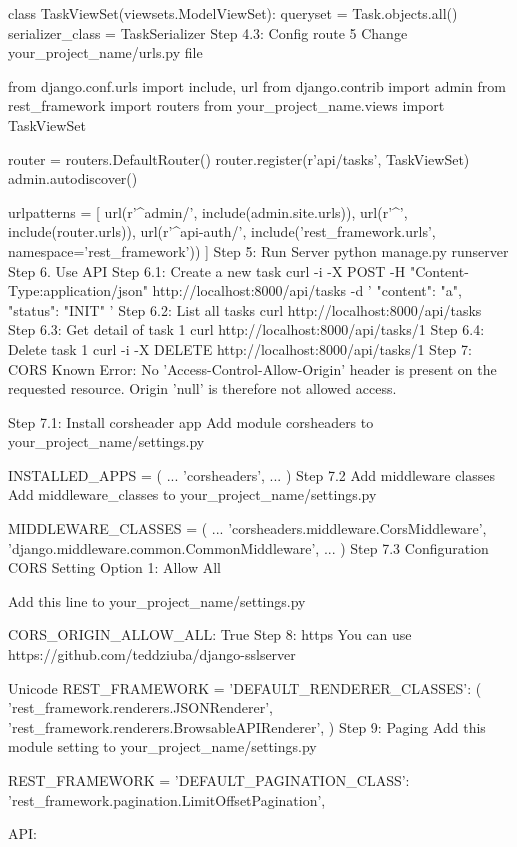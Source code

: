 class TaskViewSet(viewsets.ModelViewSet):
    queryset = Task.objects.all()
    serializer_class = TaskSerializer
Step 4.3: Config route 5
Change your_project_name/urls.py file

from django.conf.urls import include, url
from django.contrib import admin
from rest_framework import routers
from your_project_name.views import TaskViewSet

router = routers.DefaultRouter()
router.register(r'api/tasks', TaskViewSet)
admin.autodiscover()

urlpatterns = [
    url(r'^admin/', include(admin.site.urls)),
    url(r'^', include(router.urls)),
    url(r'^api-auth/', include('rest_framework.urls', namespace='rest_framework'))
]
Step 5: Run Server
python manage.py runserver
Step 6. Use API
Step 6.1: Create a new task
curl -i -X POST -H "Content-Type:application/json" http://localhost:8000/api/tasks -d '{
  "content": "a",
  "status": "INIT"
}'
Step 6.2: List all tasks
curl http://localhost:8000/api/tasks
Step 6.3: Get detail of task 1
curl http://localhost:8000/api/tasks/1
Step 6.4: Delete task 1
curl -i -X DELETE http://localhost:8000/api/tasks/1
Step 7: CORS
Known Error: No 'Access-Control-Allow-Origin' header is present on the requested resource. Origin 'null' is therefore not allowed access.

Step 7.1: Install corsheader app
Add module corsheaders to your_project_name/settings.py

INSTALLED_APPS = (
    ...
    'corsheaders',
    ...
)
Step 7.2 Add middleware classes
Add middleware_classes to your_project_name/settings.py

MIDDLEWARE_CLASSES = (
    ...
    'corsheaders.middleware.CorsMiddleware',
    'django.middleware.common.CommonMiddleware',
    ...
)
Step 7.3 Configuration CORS Setting
Option 1: Allow All

Add this line to your_project_name/settings.py

CORS_ORIGIN_ALLOW_ALL: True
Step 8: https
You can use https://github.com/teddziuba/django-sslserver

Unicode
REST_FRAMEWORK = {
    'DEFAULT_RENDERER_CLASSES': (
        'rest_framework.renderers.JSONRenderer',
        'rest_framework.renderers.BrowsableAPIRenderer',
    )
}
Step 9: Paging
Add this module setting to your_project_name/settings.py


REST_FRAMEWORK = {
    'DEFAULT_PAGINATION_CLASS': 'rest_framework.pagination.LimitOffsetPagination',
}

API:


